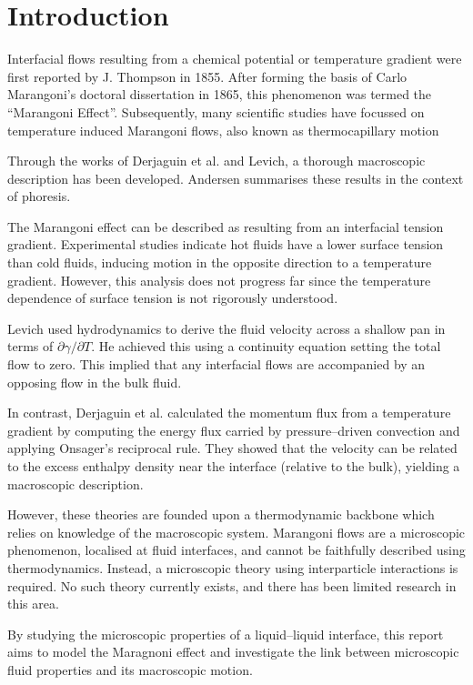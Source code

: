 \section{Introduction}
Interfacial flows resulting from a chemical potential or temperature gradient were first reported by J. Thompson in 1855.\cite{JThompson}
After forming the basis of Carlo Marangoni's doctoral dissertation in 1865, this phenomenon was termed the ``Marangoni Effect''.\cite{Marangoni}
Subsequently, many scientific studies have focussed on temperature induced Marangoni flows, also known as thermocapillary motion

Through the works of Derjaguin et al.\cite{SurfaceForces} and Levich\cite{Levich}, a thorough macroscopic description has been developed.
Andersen summarises these results in the context of phoresis.\cite{Andersen}

The Marangoni effect can be described as resulting from an interfacial tension gradient.
Experimental studies indicate hot fluids have a lower surface tension than cold fluids,\cite{Ficalbi1972,Kayser1975} inducing motion in the opposite direction to a temperature gradient.
However, this analysis does not progress far since the temperature dependence of surface tension is not rigorously understood.

Levich used hydrodynamics to derive the fluid velocity across a shallow pan in terms of $\partial \gamma / \partial T$.\cite{Levich}
He achieved this using a continuity equation setting the total flow to zero.
This implied that any interfacial flows are accompanied by an opposing flow in the bulk fluid.

In contrast, Derjaguin et al. calculated the momentum flux from a temperature gradient by computing the energy flux carried by pressure--driven convection and applying Onsager's reciprocal rule.\cite{SurfaceForces}
They showed that the velocity can be related to the excess enthalpy density near the interface (relative to the bulk), yielding a macroscopic description.

However, these theories are founded upon a thermodynamic backbone which relies on knowledge of the macroscopic system.
Marangoni flows are a microscopic phenomenon, localised at fluid interfaces, and cannot be faithfully described using thermodynamics.
Instead, a microscopic theory using interparticle interactions is required.
No such theory currently exists, and there has been limited research in this area.\cite{HolgerBoppHampe}

By studying the microscopic properties of a liquid--liquid interface, this report aims to model the Maragnoni effect and investigate the link between microscopic fluid properties and its macroscopic motion.

